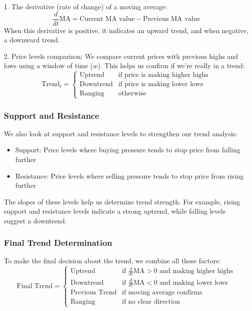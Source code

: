 \documentclass[12pt]{article}
\begin{document}
1. The derivative (rate of change) of a moving average:
\begin{equation*}
    \frac{d}{dt}\text{MA} = \text{Current MA value} - \text{Previous MA value}
\end{equation*}
When this derivative is positive, it indicates an upward trend, and when negative, a downward trend.

2. Price levels comparison:
We compare current prices with previous highs and lows using a window of time ($w$). This helps us confirm if we're really in a trend:
\begin{equation*}
\text{Trend}_t = \begin{cases}
    \text{Uptrend} & \text{if price is making higher highs} \\
    \text{Downtrend} & \text{if price is making lower lows} \\
    \text{Ranging} & \text{otherwise}
\end{cases}
\end{equation*}

\subsubsection{Support and Resistance}
We also look at support and resistance levels to strengthen our trend analysis:

\begin{itemize}
    \item Support: Price levels where buying pressure tends to stop price from falling further
    \item Resistance: Price levels where selling pressure tends to stop price from rising further
\end{itemize}

The slopes of these levels help us determine trend strength. For example, rising support and resistance levels indicate a strong uptrend, while falling levels suggest a downtrend.

\subsubsection{Final Trend Determination}
To make the final decision about the trend, we combine all these factors:
\begin{equation*}
\text{Final Trend} = \begin{cases}
    \text{Uptrend} & \text{if } \frac{d}{dt}\text{MA} > 0 \text{ and making higher highs} \\
    \text{Downtrend} & \text{if } \frac{d}{dt}\text{MA} < 0 \text{ and making lower lows} \\
    \text{Previous Trend} & \text{if moving average confirms} \\
    \text{Ranging} & \text{if no clear direction}
\end{cases}
\end{equation*}
\end{document}
